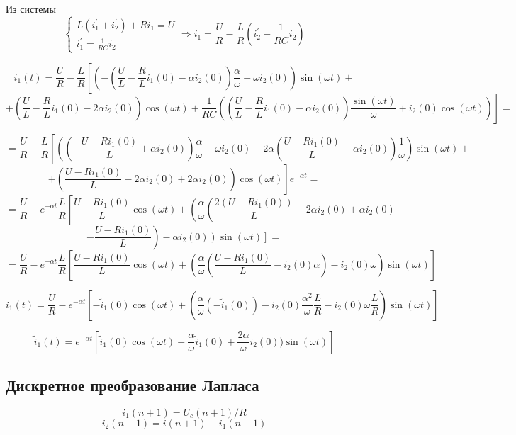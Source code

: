 \documentclass[a4paper,12pt]{article}
\begin{document}
Из системы 
$$
\left\{
\begin{array}{lcl}
	L(i_1^\prime + i_2^\prime) + Ri_1 = U\\[1.5mm]
	i_1^\prime = \frac{1}{RC} i_2
\end{array}\right. \Rightarrow
i_1 = \frac{U}{R} - \frac{L}{R}\left(i_2^\prime + \frac{1}{RC}i_2\right)
$$

$$
i_1(t) = \frac{U}{R} - \frac{L}{R}\left[\left(-\left(\frac{U}{L}-\frac{R}{L}i_1(0) 
- \alpha i_2(0)\right)\frac{\alpha}{\omega}  -\omega i_2(0)\right)\sin(\omega t)\right. +
$$
$$
+\!\left.\left(\!\frac{U}{L}-\frac{R}{L}i_1(0) -2\alpha i_2(0)\!\right)\!\cos(\omega t)
 +
\frac{1}{RC}\!\left(\!\!\left(\frac{U}{L} - \frac{R}{L}i_1(0) -\alpha i_2(0)\!\right)\!\frac{\sin(\omega t)}{\omega}
+i_2(0)\cos(\omega t)\right)
\right]=
$$

$$
= \frac{U}{R} - \frac{L}{R} \!\left[\left(\!\!\left(-\frac{U-Ri_1(0)}{L} + \alpha i_2(0) %
\!\right)\!\frac{\alpha}{\omega} -\omega i_2(0)+ 2\alpha \left(\frac{U - Ri_1(0)}{L} - \alpha i_2(0)\right)\frac{1}{\omega}
\!\right)\sin(\omega t)\right. +
$$
$$
+ \left.\left(\frac{U -Ri_1(0)}{L} - 2\alpha i_2(0) + 2\alpha i_2(0) \right)\cos(\omega t)\right]
e^{-\alpha t} =
$$
$$
=\frac{U}{R} - e^{-\alpha t}\frac{L}{R}\left[\frac{U-Ri_1(0)}{L}\cos(\omega t) +
\left(\frac{\alpha}{\omega} \left( \frac{2(U-Ri_1(0))}{L}  -2 \alpha i_2(0) + \alpha i_2(0) 
\right.\right.\right. -
$$
$$
-\left.\frac{U-Ri_1(0)}{L}\right) 
-\left.\left.\alpha i_2(0)\right)\sin(\omega t)\right] =
$$
$$
=\frac{U}{R} - e^{-\alpha t} \frac{L}{R}\left[\frac{U-Ri_1(0)}{L}\cos(\omega t) +
\left(\frac{\alpha}{\omega}
\left(\frac{U-Ri_1(0)}{L} - i_2(0)\alpha\right) - i_2(0)\omega
\right)\sin(\omega t) 
\right]
$$

$$
i_1(t)=\frac{U}{R} - e^{-\alpha t} \left[ -\tilde{i}_1(0)\cos(\omega t)  + 
\left( \frac{\alpha}{\omega}\left(-\tilde{i}_1(0)\right) -i_2(0)\frac{\alpha^2}{\omega}\frac{L}{R}
- i_2(0)\omega\frac{L}{R} \right)\sin(\omega t ) %
\right]
$$

$$
\tilde{i}_1(t) = e^{-\alpha t}\left[ \tilde{i}_1(0)\cos(\omega t) + \frac{\alpha}{\omega}\tilde{i}_1(0) + 
\frac{2\alpha}{\omega} i_2(0)) \sin(\omega t)\right]
$$

\subsection{Дискретное преобразование Лапласа}

$$
i_1(n+1) = U_c(n+1)/R
$$
$$
i_2(n+1) = i(n+1) - i_1(n+1)
$$
\end{document}
